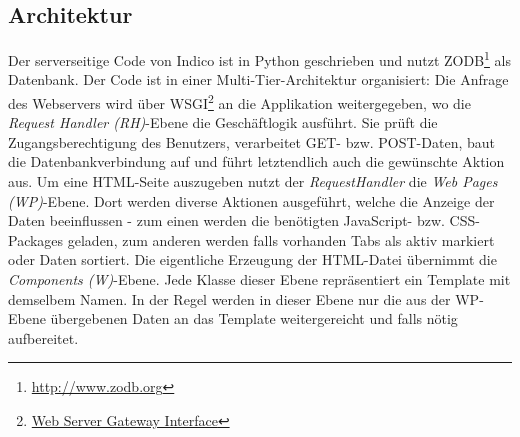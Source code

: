 \subsection{Architektur}
Der serverseitige Code von Indico ist in Python geschrieben und nutzt
ZODB\footnote{\href{http://www.zodb.org}{http://www.zodb.org}} als Datenbank. Der Code ist in einer
Multi-Tier-Architektur organisiert: Die Anfrage des Webservers wird über
WSGI\footnote{\href{http://www.python.org/dev/peps/pep-0333/}{Web Server Gateway Interface}} an die
Applikation weitergegeben, wo die \emph{Request Handler (RH)}-Ebene die Geschäftlogik ausführt. Sie
prüft die Zugangsberechtigung des Benutzers, verarbeitet GET- bzw. POST-Daten, baut die
Datenbankverbindung auf und führt letztendlich auch die gewünschte Aktion aus. Um eine HTML-Seite
auszugeben nutzt der \emph{RequestHandler} die \emph{Web Pages (WP)}-Ebene. Dort werden diverse
Aktionen ausgeführt, welche die Anzeige der Daten beeinflussen - zum einen werden die benötigten
JavaScript- bzw. CSS-Packages geladen, zum anderen werden falls vorhanden Tabs als aktiv markiert
oder Daten sortiert. Die eigentliche Erzeugung der HTML-Datei übernimmt die \emph{Components
(W)}-Ebene. Jede Klasse dieser Ebene repräsentiert ein Template mit demselbem Namen. In der Regel
werden in dieser Ebene nur die aus der WP-Ebene übergebenen Daten an das Template weitergereicht und
falls nötig aufbereitet.
